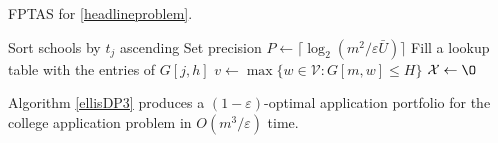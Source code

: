 \begin{algorithm}[h] 
\caption{FPTAS for \eqref{headlineproblem}.} \label{ellisDP3}
Sort schools by $t_j$ ascending\;
Set precision $P \gets \bigl\lceil\log_{2}\left(m^2 / \varepsilon \bar U\right)\bigr\rceil$\;
Fill a lookup table with the entries of $G[j, h]$\; \label{createdlookuptable}
$v\gets  \max\{ w \in \mathcal{V} : G[m, w] \leq H\}$\; \label{vrecordedhere}
$\mathcal{X} \gets \O$\;
\;
\end{algorithm}

\begin{theorem} \label{validityoffptas}
Algorithm \ref{ellisDP3} produces a $(1 - \varepsilon)$-optimal application portfolio for the college application problem in $O(m^3 /\varepsilon)$ time. %
\end{theorem}

